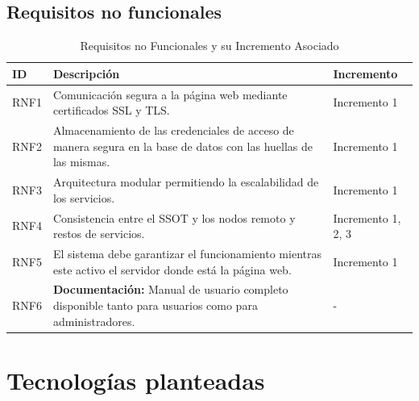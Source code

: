 \subsection{Requisitos no funcionales}
\begin{table}[htbp]
    \centering
    \caption{Requisitos no Funcionales y su Incremento Asociado}
    \label{tab:rnf_simple}
    \begin{tabularx}{\textwidth}{l X l}
        \toprule
        \textbf{ID} & \textbf{Descripción} & \textbf{Incremento} \\ \midrule
        RNF1 & Comunicación segura a la página web mediante certificados SSL y TLS. & Incremento 1 \\
        RNF2 & Almacenamiento de las credenciales de acceso de manera segura en la base de datos con las huellas de las mismas. & Incremento 1 \\
        RNF3 & Arquitectura modular permitiendo la escalabilidad de los servicios. & Incremento 1 \\
        RNF4 & Consistencia entre el SSOT y los nodos remoto y restos de servicios. & Incremento 1, 2, 3 \\
        RNF5 & El sistema debe garantizar el funcionamiento mientras este activo el servidor donde está la página web. & Incremento 1 \\
        RNF6 & \textbf{Documentación:} Manual de usuario completo disponible tanto para usuarios como para administradores. & - \\ \bottomrule
    \end{tabularx}
\end{table}
\normalsize
\newpage
\section{Tecnologías planteadas}

